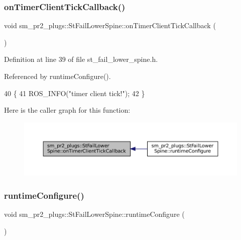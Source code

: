 \subsubsection{\texorpdfstring{on\+Timer\+Client\+Tick\+Callback()}{onTimerClientTickCallback()}}
{\footnotesize\ttfamily void sm\+\_\+pr2\+\_\+plugs\+::\+St\+Fail\+Lower\+Spine\+::on\+Timer\+Client\+Tick\+Callback (\begin{DoxyParamCaption}{ }\end{DoxyParamCaption})\hspace{0.3cm}{\ttfamily [inline]}}



Definition at line 39 of file st\+\_\+fail\+\_\+lower\+\_\+spine.\+h.



Referenced by runtime\+Configure().


\begin{DoxyCode}
40     \{
41         ROS\_INFO(\textcolor{stringliteral}{"timer client tick!"});
42     \}
\end{DoxyCode}
Here is the caller graph for this function\+:
\nopagebreak
\begin{figure}[H]
\begin{center}
\leavevmode
\includegraphics[width=350pt]{structsm__pr2__plugs_1_1StFailLowerSpine_add90ff06e4fa2743017927b67e274c95_icgraph}
\end{center}
\end{figure}
\mbox{\label{structsm__pr2__plugs_1_1StFailLowerSpine_af368b88521b53cb5b46dc68a2dffa036}} 
\subsubsection{\texorpdfstring{runtime\+Configure()}{runtimeConfigure()}}
{\footnotesize\ttfamily void sm\+\_\+pr2\+\_\+plugs\+::\+St\+Fail\+Lower\+Spine\+::runtime\+Configure (\begin{DoxyParamCaption}{ }\end{DoxyParamCaption})\hspace{0.3cm}{\ttfamily [inline]}}



